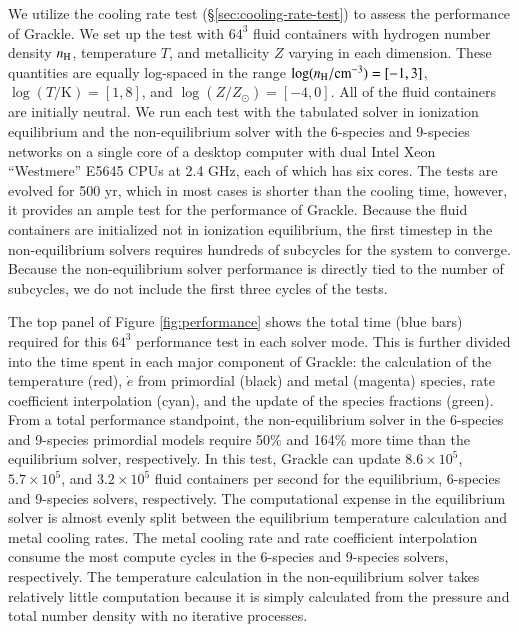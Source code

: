 We utilize the cooling rate test (\S\ref{sec:cooling-rate-test}) to
assess the performance of Grackle.  We set up the test with $64^3$
fluid containers with hydrogen number density $n_{\rm H}$, temperature
$T$, and metallicity $Z$ varying in each dimension.  These quantities
are equally log-spaced in the range $\log (n_{\rm H} /
\textrm{cm}^{-3}) = [-1, 3]$, $\log (T/\textrm{K}) = [1, 8]$, and
$\log (Z/Z_\odot) = [-4, 0]$.  All of the fluid containers are
initially neutral.  We run each test with the tabulated solver in
ionization equilibrium and the non-equilibrium solver with the
6-species and 9-species networks on a single core of a desktop
computer with dual Intel Xeon ``Westmere'' E5645 CPUs at 2.4 GHz, each
of which has six cores.  The tests are evolved for 500 yr, which in
most cases is shorter than the cooling time, however, it provides an
ample test for the performance of Grackle.  Because the fluid
containers are initialized not in ionization equilibrium, the first
timestep in the non-equilibrium solvers requires hundreds of subcycles
for the system to converge.  Because the non-equilibrium solver
performance is directly tied to the number of subcycles, we do not
include the first three cycles of the tests.


The top panel of Figure \ref{fig:performance} shows the total time
(blue bars) required for this $64^3$ performance test in each solver
mode.  This is further divided into the time spent in each major
component of Grackle: the calculation of the temperature (red),
$\dot{e}$ from primordial (black) and metal (magenta) species, rate
coefficient interpolation (cyan), and the update of the species
fractions (green).  From a total performance standpoint, the
non-equilibrium solver in the 6-species and 9-species primordial
models require 50\% and 164\% more time than the equilibrium solver,
respectively.  In this test, Grackle can update $8.6 \times 10^5$,
$5.7 \times 10^5$, and $3.2 \times 10^5$ fluid containers per second
for the equilibrium, 6-species and 9-species solvers, respectively.
The computational expense in the equilibrium solver is almost evenly
split between the equilibrium temperature calculation and metal
cooling rates.  The metal cooling rate and rate coefficient
interpolation consume the most compute cycles in the 6-species and
9-species solvers, respectively.  The temperature calculation in the
non-equilibrium solver takes relatively little computation because it
is simply calculated from the pressure and total number density with
no iterative processes.

